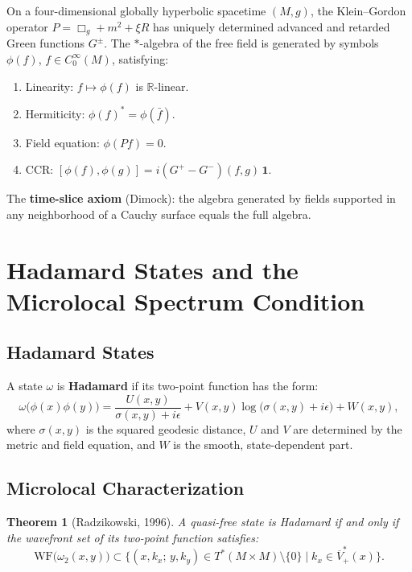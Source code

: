 \documentclass[11pt,a4paper]{article}
\newtheorem{theorem}{Theorem}[section]
\begin{document}
On a four-dimensional globally hyperbolic spacetime $(M, g)$, the Klein--Gordon
operator $P = \Box_g + m^2 + \xi R$ has uniquely determined advanced and
retarded Green functions $G^\pm$. The $*$-algebra of the free field is
generated by symbols $\phi(f)$, $f \in C_0^\infty(M)$, satisfying:
\begin{enumerate}[nosep]
  \item Linearity: $f \mapsto \phi(f)$ is $\mathbb{R}$-linear.
  \item Hermiticity: $\phi(f)^* = \phi(\bar{f})$.
  \item Field equation: $\phi(Pf) = 0$.
  \item CCR: $[\phi(f), \phi(g)] = i(G^+ - G^-)(f,g)\,\mathbf{1}$.
\end{enumerate}

The \textbf{time-slice axiom} (Dimock): the algebra generated by fields
supported in any neighborhood of a Cauchy surface equals the full algebra.

\section{Hadamard States and the Microlocal Spectrum Condition}

\subsection{Hadamard States}

A state $\omega$ is \textbf{Hadamard} if its two-point function has the form:
\begin{equation}
  \omega\bigl(\phi(x)\phi(y)\bigr) = \frac{U(x,y)}{\sigma(x,y) + i\epsilon}
  + V(x,y)\log\bigl(\sigma(x,y) + i\epsilon\bigr) + W(x,y),
\end{equation}
where $\sigma(x,y)$ is the squared geodesic distance, $U$ and $V$ are
determined by the metric and field equation, and $W$ is the smooth,
state-dependent part.

\subsection{Microlocal Characterization}

\begin{theorem}[Radzikowski, 1996]
A quasi-free state is Hadamard if and only if the wavefront set of its
two-point function satisfies:
\[
  \mathrm{WF}\bigl(\omega_2(x,y)\bigr) \subset
  \bigl\{(x,k_x;\,y,k_y) \in T^*(M \times M) \setminus \{0\}
  \;\big|\; k_x \in \overline{V}_+^*(x)\bigr\}.
\]
\end{theorem}
\end{document}
